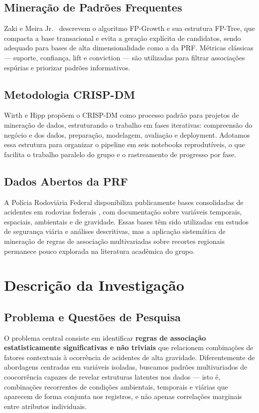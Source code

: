 \documentclass[12pt]{article}
\begin{document}
\subsection{Mineração de Padrões Frequentes}

Zaki e Meira Jr.\ \cite{zaki2020} descrevem o algoritmo FP-Growth e sua estrutura FP-Tree, que compacta a base transacional e evita a geração explícita de candidatos, sendo adequado para bases de alta dimensionalidade como a da PRF. Métricas clássicas --- suporte, confiança, lift e conviction --- são utilizadas para filtrar associações espúrias e priorizar padrões informativos.

\subsection{Metodologia CRISP-DM}

Wirth e Hipp \cite{wirth2000} propõem o CRISP-DM como processo padrão para projetos de mineração de dados, estruturando o trabalho em fases iterativas: compreensão do negócio e dos dados, preparação, modelagem, avaliação e deployment. Adotamos essa estrutura para organizar o pipeline em seis notebooks reprodutíveis, o que facilita o trabalho paralelo do grupo e o rastreamento de progresso por fase.

\subsection{Dados Abertos da PRF}

A Polícia Rodoviária Federal disponibiliza publicamente bases consolidadas de acidentes em rodovias federais \cite{prf2026}, com documentação sobre variáveis temporais, espaciais, ambientais e de gravidade. Essas bases têm sido utilizadas em estudos de segurança viária e análises descritivas, mas a aplicação sistemática de mineração de regras de associação multivariadas sobre recortes regionais permanece pouco explorada na literatura acadêmica do grupo.

\section{Descrição da Investigação}

\subsection{Problema e Questões de Pesquisa}

O problema central consiste em identificar \textbf{regras de associação estatisticamente significativas e não triviais} que relacionem combinações de fatores contextuais à ocorrência de acidentes de alta gravidade. Diferentemente de abordagens centradas em variáveis isoladas, buscamos padrões multivariados de coocorrência capazes de revelar estruturas latentes nos dados --- isto é, combinações recorrentes de condições ambientais, temporais e viárias que aparecem de forma conjunta nos registros, e não apenas correlações marginais entre atributos individuais.
\end{document}
